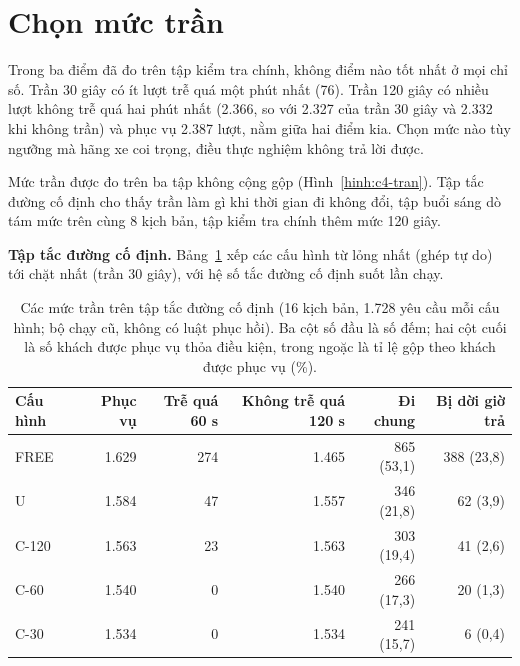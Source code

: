 \section{Chọn mức trần}
\label{muc:c4-chontran}

Trong ba điểm đã đo trên tập kiểm tra chính, không điểm nào tốt nhất ở mọi chỉ số. Trần 30 giây có ít lượt trễ quá một
phút nhất (76). Trần 120 giây có nhiều lượt không trễ quá hai phút nhất (2.366, so với 2.327 của trần 30 giây và 2.332
khi không trần) và phục vụ 2.387 lượt, nằm giữa hai điểm kia. Chọn mức nào tùy ngưỡng mà hãng xe coi trọng, điều thực
nghiệm không trả lời được.

Mức trần được đo trên ba tập không cộng gộp (Hình~\ref{hinh:c4-tran}). Tập tắc đường cố định cho thấy trần làm gì khi
thời gian đi không đổi, tập buổi sáng dò tám mức trên cùng 8 kịch bản, tập kiểm tra chính thêm mức 120 giây.

\textbf{Tập tắc đường cố định.} Bảng~\ref{bang:c4-codinh} xếp các cấu hình từ lỏng nhất (ghép tự do) tới chặt nhất
(trần 30 giây), với hệ số tắc đường cố định suốt lần chạy.

\begin{table}[htbp]
\centering
\caption{Các mức trần trên tập tắc đường cố định (16 kịch bản, 1.728 yêu cầu mỗi cấu hình; bộ chạy cũ,
không có luật phục hồi). Ba cột số đầu là số đếm; hai cột cuối là số khách được phục vụ thỏa điều kiện, trong ngoặc
là tỉ lệ gộp theo khách được phục vụ (\%).}
\label{bang:c4-codinh}
\small
\begin{tabular}{@{}lrrrrr@{}}
\toprule
\textbf{Cấu hình} & \textbf{Phục vụ} & \textbf{Trễ quá 60 s} & \textbf{Không trễ quá 120 s} &
\textbf{Đi chung} & \textbf{Bị dời giờ trả}\\
\midrule
FREE & 1.629 & 274 & 1.465 & 865 (53,1) & 388 (23,8)\\
U & 1.584 & 47 & 1.557 & 346 (21,8) & 62 (3,9)\\
C-120 & 1.563 & 23 & 1.563 & 303 (19,4) & 41 (2,6)\\
C-60 & 1.540 & 0 & 1.540 & 266 (17,3) & 20 (1,3)\\
C-30 & 1.534 & 0 & 1.534 & 241 (15,7) & 6 (0,4)\\
\bottomrule
\end{tabular}
\end{table}

